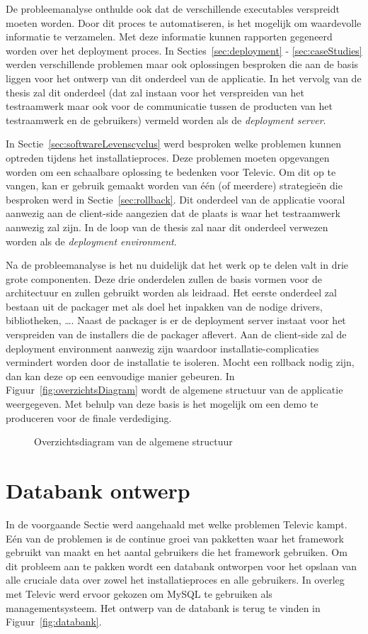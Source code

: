 De probleemanalyse onthulde ook dat de verschillende executables verspreidt moeten worden.
Door dit proces te automatiseren, is het mogelijk om waardevolle informatie te verzamelen.
Met deze informatie kunnen rapporten gegeneerd worden over het deployment proces.
In Secties~\ref{sec:deployment} - \ref{sec:caseStudies} werden verschillende problemen maar ook oplossingen besproken die aan de basis liggen voor het ontwerp van dit onderdeel van de applicatie. 
In het vervolg van de thesis zal dit onderdeel (dat zal instaan voor het verspreiden van het testraamwerk maar ook voor de communicatie tussen de producten van het testraamwerk en de gebruikers) vermeld worden als de \emph{deployment server}.

In Sectie~\vref{sec:softwareLevenscyclus} werd besproken welke problemen kunnen optreden tijdens het installatieproces.
Deze problemen moeten opgevangen worden om een schaalbare oplossing te bedenken voor Televic.
Om dit op te vangen, kan er gebruik gemaakt worden van één (of meerdere) strategieën die besproken werd in Sectie~\vref{sec:rollback}.
Dit onderdeel van de applicatie vooral aanwezig aan de client-side aangezien dat de plaats is waar het testraamwerk aanwezig zal zijn.
In de loop van de thesis zal naar dit onderdeel verwezen worden als de \emph{deployment environment}.

Na de probleemanalyse is het nu duidelijk dat het werk op te delen valt in drie grote componenten.
Deze drie onderdelen zullen de basis vormen voor de architectuur en zullen gebruikt worden als leidraad.
Het eerste onderdeel zal bestaan uit de packager met als doel het inpakken van de nodige drivers, bibliotheken, \ldots .
Naast de packager is er de deployment server instaat voor het verspreiden van de installers die de packager aflevert.
Aan de client-side zal de deployment environment aanwezig zijn waardoor installatie-complicaties vermindert worden door de installatie te isoleren.
Mocht een rollback nodig zijn, dan kan deze op een eenvoudige manier gebeuren.
In Figuur~\vref{fig:overzichtsDiagram} wordt de algemene structuur van de applicatie weergegeven.
Met behulp van deze basis is het mogelijk om een demo te produceren voor de finale verdediging.

\begin{figure}[!hbt]
\centering
  
  \caption{Overzichtsdiagram van de algemene structuur}
  \label{fig:overzichtsDiagram}
\end{figure}

\section{Databank ontwerp}\label{sec:databank}
In de voorgaande Sectie werd aangehaald met welke problemen Televic kampt.
Eén van de problemen is de continue groei van pakketten waar het framework gebruikt van maakt en het aantal gebruikers die het framework gebruiken.
Om dit probleem aan te pakken wordt een databank ontworpen voor het opslaan van alle cruciale data over zowel het installatieproces en alle gebruikers.
In overleg met Televic werd ervoor gekozen om MySQL te gebruiken als managementsysteem.
Het ontwerp van de databank is terug te vinden in Figuur~\vref{fig:databank}.

